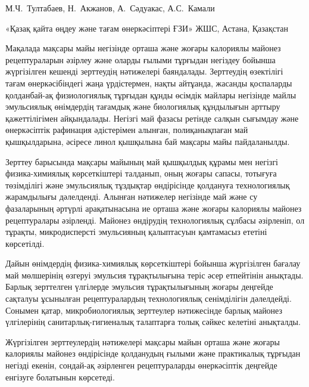 
\begin{header}

М.Ч.~Тултабаев,
Н.~Акжанов,
А.~Сәдуакас,
А.С.~Камали
\end{header}

\begin{affil}
«Қазақ қайта өңдеу және тағам өнеркәсіптері ҒЗИ» ЖШС, Астана, Қазақстан

\end{affil}

Мақалада мақсары майы негізінде орташа және жоғары калориялы майонез
рецептураларын әзірлеу және оларды ғылыми тұрғыдан негіздеу бойынша
жүргізілген кешенді зерттеудің нәтижелері баяндалады. Зерттеудің
өзектілігі тағам өнеркәсібіндегі жаңа үрдістермен, нақты айтұанда,
жасанды қоспаларды қолданбай-ақ физиологиялық тұрғыдан құнды өсімдік
майлары негізінде майлы эмульсиялық өнімдердің тағамдық және биологиялық
құндылығын арттыру қажеттілігімен айқындалады. Негізгі май фазасы
ретінде салқын сығымдау және өнеркәсіптік рафинация әдістерімен алынған,
полиқанықпаған май қышқылдарына, әсіресе линол қышқылына бай мақсары
майы пайдаланылды.

Зерттеу барысында мақсары майының май қышқылдық құрамы мен негізгі
физика-химиялық көрсеткіштері талданып, оның жоғары сапасы, тотығуға
төзімділігі және эмульсиялық тұздықтар өндірісінде қолдануға
технологиялық жарамдылығы дәлелденді. Алынған нәтижелер негізінде май
және су фазаларының әртүрлі арақатынасына ие орташа және жоғары
калориялы майонез рецептуралары әзірленді. Майонез өндірудің
технологиялық сұлбасы әзірленіп, ол тұрақты, микродисперсті эмульсияның
қалыптасуын қамтамасыз ететіні көрсетілді.

Дайын өнімдердің физика-химиялық көрсеткіштері бойынша жүргізілген
бағалау май мөлшері\-нің өзгеруі эмульсия тұрақтылығына теріс әсер
етпейтінін анықтады. Барлық зерттелген үлгілерде эмульсия тұрақтылығының
жоғары деңгейде сақталуы ұсынылған рецептуралардың технологиялық
сенімділігін дәлелдейді. Сонымен қатар, микробиологиялық зерттеулер
нәтижесінде барлық майонез үлгілерінің санитарлық-гигиеналық талаптарға
толық сәйкес келетіні анықталды.

Жүргізілген зерттеулердің нәтижелері мақсары майын орташа және жоғары
калориялы майонез өндірісінде қолданудың ғылыми және практикалық
тұрғыдан негізді екенін, сондай-ақ әзірленген рецептураларды
өнеркәсіптік деңгейде енгізуге болатынын көрсетеді.

